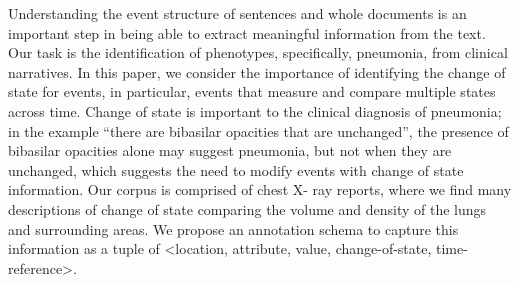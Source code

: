 Understanding the event structure of sentences and whole documents is an important step in being able to extract meaningful information from the text.
 Our task is the identification of phenotypes, specifically, pneumonia, from
 clinical narratives. In this paper, we consider the importance of identifying
 the change of state for events, in particular, events that measure and compare
 multiple states across time. Change of state is important to the clinical
 diagnosis of pneumonia; in the example ``there are bibasilar opacities that
 are unchanged'', the presence of bibasilar opacities alone may suggest
 pneumonia, but not when they are unchanged, which suggests the need to modify
 events with change of state information. Our corpus is comprised of chest X-
 ray reports, where we find many descriptions of change of state comparing the
 volume and density of the lungs and surrounding areas. We propose an annotation
 schema to capture this information as a tuple of <location, attribute, value,
 change-of-state, time-reference>.

